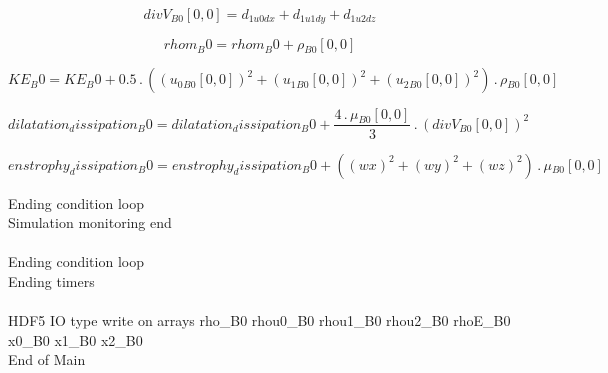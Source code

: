 \documentclass{article}
\begin{document}
\begin{dmath}{divV{_{B0}}}[{0,0}] = d_{1 u0 dx} + d_{1 u1 dy} + d_{1 u2 dz}\end{dmath}

\begin{dmath}rhom_B0 = rhom_B0 + {\rho{_{B0}}}[{0,0}]\end{dmath}

\begin{dmath}KE_B0 = KE_B0 + 0.5 \,.\, \left(\left({u_{0}{_{B0}}}[{0,0}] \right)^{2} + \left({u_{1}{_{B0}}}[{0,0}] \right)^{2} + \left({u_{2}{_{B0}}}[{0,0}] \right)^{2}\right) \,.\, {\rho{_{B0}}}[{0,0}]\end{dmath}

\begin{dmath}dilatation_dissipation_B0 = dilatation_dissipation_B0 + \frac{4 \,.\, {\mu{_{B0}}}[{0,0}]}{3} \,.\, \left({divV{_{B0}}}[{0,0}] \right)^{2}\end{dmath}

\begin{dmath}enstrophy_dissipation_B0 = enstrophy_dissipation_B0 + \left(\left(wx \right)^{2} + \left(wy \right)^{2} + \left(wz \right)^{2}\right) \,.\, {\mu{_{B0}}}[{0,0}]\end{dmath}

\noindent Ending condition loop %
\\\noindent Simulation monitoring end\\
\\\noindent Ending condition loop %
\\\noindent Ending timers\\
\\\noindent HDF5 IO type write on arrays rho_B0 rhou0_B0 rhou1_B0 rhou2_B0 rhoE_B0 x0_B0 x1_B0 x2_B0\\\noindent End of Main\\
\end{document}

